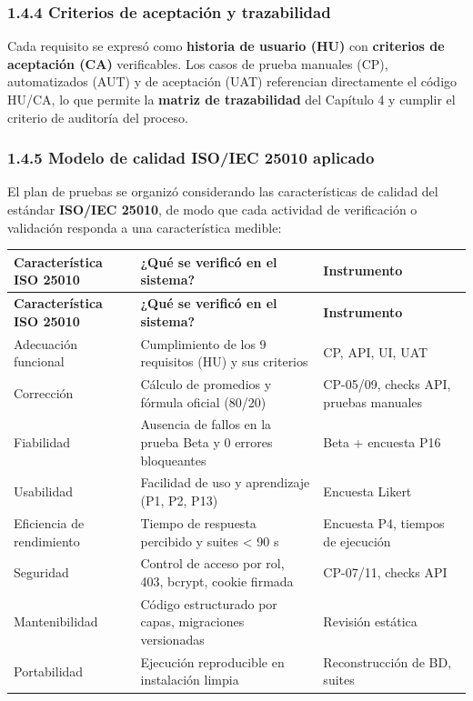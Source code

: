 \documentclass[11pt,a4paper]{article}
\begin{document}
\subsubsection*{1.4.4 Criterios de aceptación y trazabilidad}


Cada requisito se expresó como \textbf{historia de usuario (HU)} con \textbf{criterios de aceptación (CA)} verificables. Los casos de prueba manuales (CP), automatizados (AUT) y de aceptación (UAT) referencian directamente el código HU/CA, lo que permite la \textbf{matriz de trazabilidad} del Capítulo 4 y cumplir el criterio de auditoría del proceso.


\subsubsection*{1.4.5 Modelo de calidad ISO/IEC 25010 aplicado}


El plan de pruebas se organizó considerando las características de calidad del estándar \textbf{ISO/IEC 25010}, de modo que cada actividad de verificación o validación responda a una característica medible:


{\small
\begin{longtable}{|p{}|p{}|p{}|}
\rowcolor{UTECblue}\color{white}\bfseries Característica ISO 25010 & \color{white}\bfseries ¿Qué se verificó en el sistema? & \color{white}\bfseries Instrumento \\ \hline
\endfirsthead
\rowcolor{UTECblue}\color{white}\bfseries Característica ISO 25010 & \color{white}\bfseries ¿Qué se verificó en el sistema? & \color{white}\bfseries Instrumento \\ \hline
\endhead
Adecuación funcional & Cumplimiento de los 9 requisitos (HU) y sus criterios & CP, API, UI, UAT \\ \hline
Corrección & Cálculo de promedios y fórmula oficial (80/20) & CP-05/09, checks API, pruebas manuales \\ \hline
Fiabilidad & Ausencia de fallos en la prueba Beta y 0 errores bloqueantes & Beta + encuesta P16 \\ \hline
Usabilidad & Facilidad de uso y aprendizaje (P1, P2, P13) & Encuesta Likert \\ \hline
Eficiencia de rendimiento & Tiempo de respuesta percibido y suites < 90 s & Encuesta P4, tiempos de ejecución \\ \hline
Seguridad & Control de acceso por rol, 403, bcrypt, cookie firmada & CP-07/11, checks API \\ \hline
Mantenibilidad & Código estructurado por capas, migraciones versionadas & Revisión estática \\ \hline
Portabilidad & Ejecución reproducible en instalación limpia & Reconstrucción de BD, suites \\ \hline
\end{longtable}}
\end{document}
